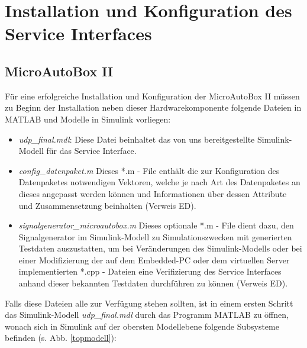 \documentclass[fontsize = 12pt, paper = a4]{scrreprt}
\begin{document}

\chapter{Installation und Konfiguration des Service Interfaces}



\section{MicroAutoBox II}

Für eine erfolgreiche Installation und Konfiguration der MicroAutoBox II müssen zu Beginn der Installation neben dieser Hardwarekomponente folgende Dateien in MATLAB und Modelle in Simulink vorliegen:

\begin{itemize}

\item \textit{udp\_final.mdl}: Diese Datei beinhaltet das von uns bereitgestellte Simulink-Modell für das Service Interface.

\item \textit{config\_datenpaket.m} Dieses *.m - File enthält die zur Konfiguration des Datenpaketes notwendigen Vektoren, welche je nach Art des Datenpaketes an dieses angepasst werden können und Informationen über dessen Attribute und Zusammensetzung beinhalten (Verweis ED).

\item \textit{signalgenerator\_microautobox.m} Dieses optionale *.m - File dient dazu, den Signalgenerator im Simulink-Modell zu Simulationszwecken mit generierten Testdaten auszustatten, um bei Veränderungen des Simulink-Modells oder bei einer Modifizierung der   auf dem Embedded-PC oder dem virtuellen Server implementierten *.cpp - Dateien eine Verifizierung des Service Interfaces anhand dieser bekannten Testdaten durchführen zu können (Verweis ED).

\end{itemize} 

Falls diese Dateien alle zur Verfügung stehen sollten, ist in einem ersten Schritt das Simulink-Modell \textit{udp\_final.mdl} durch das Programm MATLAB zu öffnen, wonach sich in Simulink auf der obersten Modellebene  folgende Subsysteme befinden (s. Abb. \ref{topmodell}):
\end{document}
